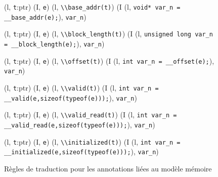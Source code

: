 \begin{figure*}[bt]
  \scriptsize{
    {
      {(l, \mbox{\lstinline't'}:ptr)  (I, \mbox{\lstinline'e'}) }
      {(l, \mbox{\lstinline'\\base_addr(t)'}) 
        (I \concat
        (l, \mbox{\lstinline'void* var_n = __base_addr(e);'}),
        \mbox{\lstinline'var_n'})
      }{}
    }

    {
      {(l, \mbox{\lstinline't'}:ptr)  (I, \mbox{\lstinline'e'}) }
      {(l, \mbox{\lstinline'\\block_length(t)'}) 
        (I \concat
        (l, \mbox{\lstinline'unsigned long var_n = __block_length(e);'}),
        \mbox{\lstinline'var_n'})
      }{}
    }

    {
      {(l, \mbox{\lstinline't'}:ptr)  (I, \mbox{\lstinline'e'}) }
      {(l, \mbox{\lstinline'\\offset(t)'}) 
        (I \concat
        (l, \mbox{\lstinline'int var_n = __offset(e);'}),
        \mbox{\lstinline'var_n'})
      }{}
    }

    {
      {(l, \mbox{\lstinline't'}:ptr)  (I, \mbox{\lstinline'e'}) }
      {(l, \mbox{\lstinline'\\valid(t)'}) 
        (I \concat
        (l, \mbox{\lstinline'int var_n = __valid(e,sizeof(typeof(e)));'}),
        \mbox{\lstinline'var_n'})
      }{}
    }

    {
      {(l, \mbox{\lstinline't'}:ptr)  (I, \mbox{\lstinline'e'}) }
      {(l, \mbox{\lstinline'\\valid_read(t)'}) 
        (I \concat
        (l, \mbox{\lstinline'int var_n = __valid_read(e,sizeof(typeof(e)));'}),
        \mbox{\lstinline'var_n'})
      }{}
    }

    {
      {(l, \mbox{\lstinline't'}:ptr)  (I, \mbox{\lstinline'e'}) }
      {(l, \mbox{\lstinline'\\initialized(t)'}) 
        (I \concat
        (l, \mbox{\lstinline'int var_n = __initialized(e,sizeof(typeof(e)));'}),
        \mbox{\lstinline'var_n'})
      }{}
    }
  }
  \caption{Règles de traduction pour les annotations liées au modèle mémoire}
  \label{fig:mem-annots-rules}
\end{figure*}


